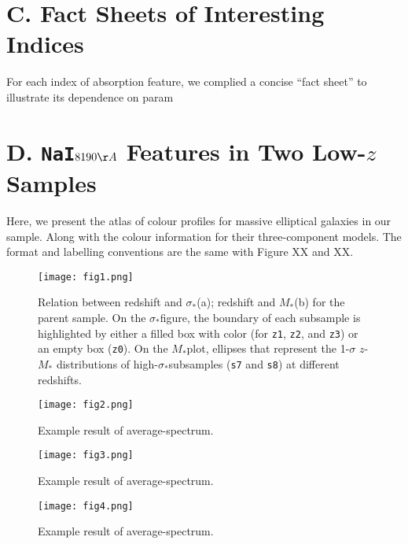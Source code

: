 \documentclass[preprint]{aastex}
\def\mstar{$M_{\ast}$}
\def\sigstar{$\sigma_{\ast}$}
\def\nai{{\tt NaI}}
\begin{document}
\begin{CJK*}{UTF8}{gbsn}
\section{C. Fact Sheets of Interesting Indices}

    For each index of absorption feature, we complied a concise ``fact 
    sheet'' to illustrate its dependence on param

\section{D. \nai $8190 \AA$ Features in Two Low-$z$ Samples} 

  Here, we present the atlas of colour profiles for massive elliptical 
  galaxies in our sample.  Along with the colour information for their 
  three-component models.  The format and labelling conventions are the 
  same with Figure XX and XX.  
  

\clearpage
{}
\begin{figure}
    \centering 
    \texttt{[image: fig1.png]}
    \caption{
    Relation between redshift and \sigstar (a); redshift and \mstar (b) for 
    the parent sample.  On the \sigstar figure, the boundary of each 
    subsample is highlighted by either a filled box with color (for 
    {\tt z1}, {\tt z2}, and {\tt z3}) or an empty box ({\tt z0}).  On the 
    \mstar plot, ellipses that represent the 1-$\sigma$ $z$-\mstar 
    distributions of high-\sigstar subsamples ({\tt s7} and {\tt s8}) 
    at different redshifts. 
    }
    \label{figure:1}
\end{figure}

\clearpage
{}
\begin{figure}
    \centering 
    \texttt{[image: fig2.png]}
    \caption{
    Example result of average-spectrum. 
    }
    \label{figure:2}
\end{figure}

\clearpage
{}
\begin{figure}
    \centering 
    \texttt{[image: fig3.png]}
    \caption{
    Example result of average-spectrum. 
    }
    \label{figure:3}
\end{figure}

\clearpage
{}
\begin{figure}
    \centering 
    \texttt{[image: fig4.png]}
    \caption{
    Example result of average-spectrum. 
    }
    \label{figure:4}
\end{figure}


\end{CJK*}
\end{document}
